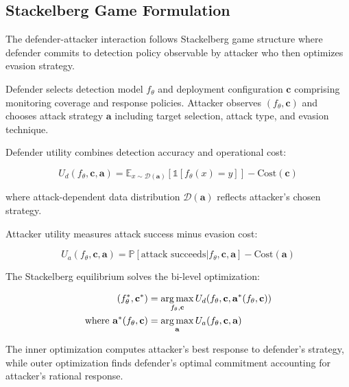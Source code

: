 

\subsection{Stackelberg Game Formulation}

The defender-attacker interaction follows Stackelberg game structure where defender commits to detection policy observable by attacker who then optimizes evasion strategy.

Defender selects detection model $f_\theta$ and deployment configuration $\mathbf{c}$ comprising monitoring coverage and response policies. Attacker observes $(f_\theta, \mathbf{c})$ and chooses attack strategy $\mathbf{a}$ including target selection, attack type, and evasion technique.

Defender utility combines detection accuracy and operational cost:

\begin{equation}
U_d(f_\theta, \mathbf{c}, \mathbf{a}) = \mathbb{E}_{x \sim \mathcal{D}(\mathbf{a})}[\mathbb{1}[f_\theta(x) = y]] - \text{Cost}(\mathbf{c})
\end{equation}

where attack-dependent data distribution $\mathcal{D}(\mathbf{a})$ reflects attacker's chosen strategy.

Attacker utility measures attack success minus evasion cost:

\begin{equation}
U_a(f_\theta, \mathbf{c}, \mathbf{a}) = \mathbb{P}[\text{attack succeeds} | f_\theta, \mathbf{c}, \mathbf{a}] - \text{Cost}(\mathbf{a})
\end{equation}

The Stackelberg equilibrium solves the bi-level optimization:

\begin{align}
(f_\theta^*, \mathbf{c}^*) &= \operatorname*{arg\,max}_{f_\theta, \mathbf{c}} U_d(f_\theta, \mathbf{c}, \mathbf{a}^*(f_\theta, \mathbf{c})) \\
\text{where } \mathbf{a}^*(f_\theta, \mathbf{c}) &= \operatorname*{arg\,max}_\mathbf{a} U_a(f_\theta, \mathbf{c}, \mathbf{a})
\end{align}

The inner optimization computes attacker's best response to defender's strategy, while outer optimization finds defender's optimal commitment accounting for attacker's rational response.

